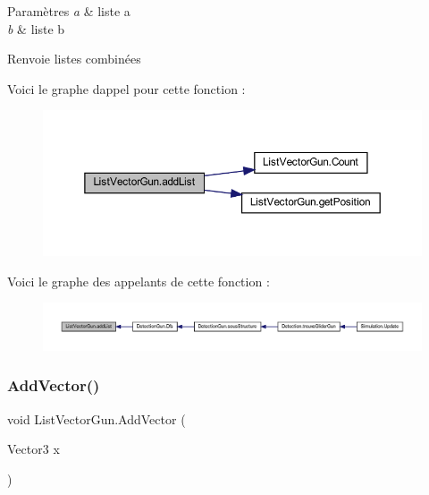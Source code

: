 \begin{DoxyParams}{Paramètres}
{\em a} & liste a\\
\hline
{\em b} & liste b\\
\hline
\end{DoxyParams}
\begin{DoxyReturn}{Renvoie}
listes combinées
\end{DoxyReturn}
Voici le graphe d\textquotesingle{}appel pour cette fonction \+:
\nopagebreak
\begin{figure}[H]
\begin{center}
\leavevmode
\includegraphics[width=350pt]{class_list_vector_gun_ae32fc88f0d58affa06527f97a19f1f70_cgraph}
\end{center}
\end{figure}
Voici le graphe des appelants de cette fonction \+:
\nopagebreak
\begin{figure}[H]
\begin{center}
\leavevmode
\includegraphics[width=350pt]{class_list_vector_gun_ae32fc88f0d58affa06527f97a19f1f70_icgraph}
\end{center}
\end{figure}
\mbox{\label{class_list_vector_gun_a9dc269fd17f18f6c9f4e974990c6e442}} 
\subsubsection{\texorpdfstring{Add\+Vector()}{AddVector()}}
{\footnotesize\ttfamily void List\+Vector\+Gun.\+Add\+Vector (\begin{DoxyParamCaption}\item[{Vector3}]{x }\end{DoxyParamCaption})\hspace{0.3cm}{\ttfamily [inline]}}



